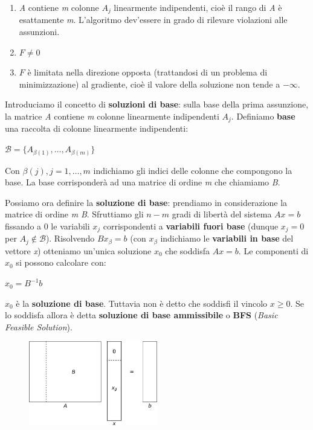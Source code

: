 \documentclass[11pt]{book}
\begin{document}
\begin{enumerate}
  
\item {\em A} contiene {\em m} colonne $A_j$ linearmente indipendenti,
  cio\`e il rango di {\em A} \`e esattamente {\em m}. L'algoritmo
  dev'essere in grado di rilevare violazioni alle assunzioni.

\item $F \neq 0$

\item $F$ \`e limitata nella direzione opposta (trattandosi di un
  problema di minimizzazione) al gradiente, cio\`e il valore della
  soluzione non tende a $-\infty$.

\end{enumerate}

Introduciamo il concetto di {\bf soluzioni di base}: sulla base della
prima assunzione, la matrice {\em A} contiene {\em m} colonne
linearmente indipendenti $A_j$. Definiamo {\bf base} una raccolta di
colonne linearmente indipendenti:

\begin{center}
$\mathcal{B} = \{ A_{\beta (1)}, \dots, A_{\beta (m)}\}$
\end{center}

Con $\beta(j), j=1,\dots,m$ indichiamo gli indici delle colonne che
compongono la base. La base corrisponder\`a ad una matrice di ordine
{\em m} che chiamiamo {\em B}. 

Possiamo ora definire la {\bf soluzione di base}: prendiamo in
considerazione la matrice di ordine {\em m} {\em B}. Sfruttiamo gli
$n-m$ gradi di libert\`a del sistema $Ax=b$ fissando a 0 le variabili
$x_j$ corrispondenti a {\bf variabili fuori base} (dunque $x_j = 0$
per $A_j \not\in \mathcal{B}$). Risolvendo $Bx_\beta = b$ (con
$x_\beta$ indichiamo le {\bf variabili in base} del vettore {\em x})
otteniamo un'unica soluzione $x_0$ che soddisfa $Ax = b$. Le
componenti di $x_0$ si possono calcolare con:

\begin{center}
$x_0 = B^{-1}b$
\end{center}

$x_0$ \`e la {\bf soluzione di base}. Tuttavia non \`e detto che
soddisfi il vincolo $x \geq 0$. Se lo soddisfa allora \`e detta {\bf
  soluzione di base ammissibile} o {\bf BFS} ({\em Basic Feasible
  Solution}).
\newline

\begin{figure}[h!]
  \centering
  \includegraphics[width=0.5\textwidth]{images/sba.png}
\end{figure}
\end{document}

